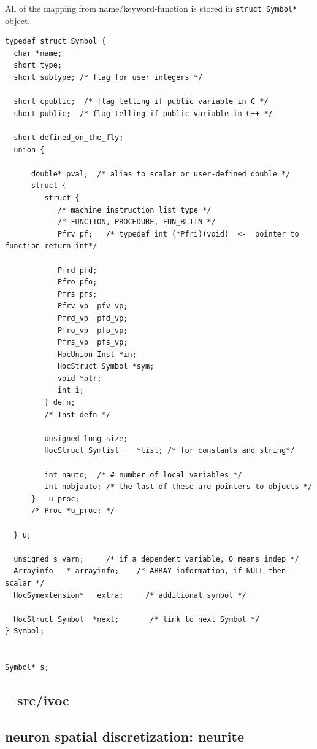 All of the mapping from name/keyword-function is stored in \verb!struct Symbol*!
object.
\begin{verbatim}
typedef struct Symbol {
  char *name;
  short type;
  short subtype; /* flag for user integers */
  
  short cpublic;  /* flag telling if public variable in C */
  short public;  /* flag telling if public variable in C++ */
  
  short defined_on_the_fly;
  union {
  
      double* pval;  /* alias to scalar or user-defined double */
      struct {
         struct {
            /* machine instruction list type */
            /* FUNCTION, PROCEDURE, FUN_BLTIN */
            Pfrv pf;   /* typedef int (*Pfri)(void)  <-  pointer to function return int*/
             
            Pfrd pfd;
            Pfro pfo;
            Pfrs pfs;
            Pfrv_vp  pfv_vp;
            Pfrd_vp  pfd_vp;
            Pfro_vp  pfo_vp;
            Pfrs_vp  pfs_vp;
            HocUnion Inst *in;
            HocStruct Symbol *sym;
            void *ptr;
            int i;
         } defn;
         /* Inst defn */
         
         unsigned long size;
         HocStruct Symlist    *list; /* for constants and string*/
         
         int nauto;  /* # number of local variables */
         int nobjauto; /* the last of these are pointers to objects */
      }   u_proc;
      /* Proc *u_proc; */
    
  } u;
  
  unsigned s_varn;     /* if a dependent variable, 0 means indep */
  Arrayinfo   * arrayinfo;    /* ARRAY information, if NULL then scalar */
  HocSymextension*   extra;     /* additional symbol */
  
  HocStruct Symbol  *next;       /* link to next Symbol */
} Symbol;


Symbol* s;
\end{verbatim}

\subsection{-- src/ivoc}
\label{sec:ivoc-interpreter}



\subsection{neuron spatial discretization: neurite}
\label{sec:neurite}

